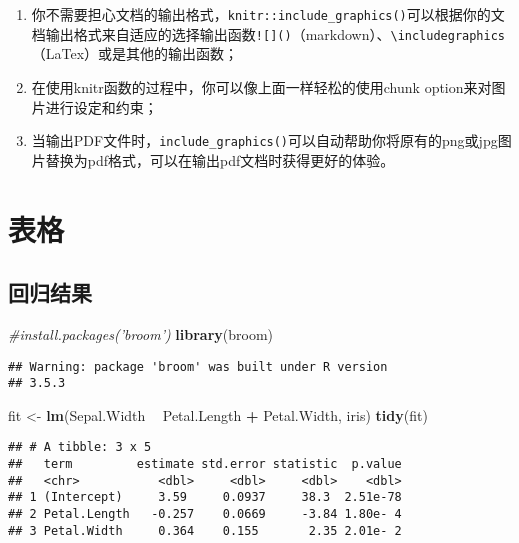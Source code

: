 \documentclass[singlesided]{Style/ucasthesis}%
\newcommand{\tightlist}{%
  \setlength{\itemsep}{0pt}\setlength{\parskip}{0pt}}
\newenvironment{Shaded}{\begin{snugshade}}{\end{snugshade}}
\newcommand{\KeywordTok}[1]{\textcolor[rgb]{0.13,0.29,0.53}{\textbf{{#1}}}}
\newcommand{\StringTok}[1]{\textcolor[rgb]{0.31,0.60,0.02}{{#1}}}
\newcommand{\CommentTok}[1]{\textcolor[rgb]{0.56,0.35,0.01}{\textit{{#1}}}}
\newcommand{\OperatorTok}[1]{\textcolor[rgb]{0.81,0.36,0.00}{\textbf{{#1}}}}
\newcommand{\NormalTok}[1]{{#1}}
\begin{document}
\begin{enumerate}
\def\labelenumi{\arabic{enumi}.}
\tightlist
\item
  你不需要担心文档的输出格式，\texttt{knitr::include\_graphics()}可以根据你的文档输出格式来自适应的选择输出函数\texttt{!{[}{]}()}（markdown）、\texttt{\textbackslash{}includegraphics}（LaTex）或是其他的输出函数；
\item
  在使用knitr函数的过程中，你可以像上面一样轻松的使用chunk option来对图片进行设定和约束；
\item
  当输出PDF文件时，\texttt{include\_graphics()}可以自动帮助你将原有的png或jpg图片替换为pdf格式，可以在输出pdf文档时获得更好的体验。
\end{enumerate}

\hypertarget{section-5}{%
\section{表格}\label{section-5}}

\hypertarget{section-6}{%
\subsection{回归结果}\label{section-6}}

\begin{Shaded}
\begin{Highlighting}[]
\CommentTok{#install.packages('broom')}
\KeywordTok{library}\NormalTok{(broom)}
\end{Highlighting}
\end{Shaded}

\begin{verbatim}
## Warning: package 'broom' was built under R version
## 3.5.3
\end{verbatim}

\begin{Shaded}
\begin{Highlighting}[]
\NormalTok{fit <-}\StringTok{ }\KeywordTok{lm}\NormalTok{(Sepal.Width }\OperatorTok{~}\StringTok{ }\NormalTok{Petal.Length }\OperatorTok{+}\StringTok{ }\NormalTok{Petal.Width, iris)}
\KeywordTok{tidy}\NormalTok{(fit)}
\end{Highlighting}
\end{Shaded}

\begin{verbatim}
## # A tibble: 3 x 5
##   term         estimate std.error statistic  p.value
##   <chr>           <dbl>     <dbl>     <dbl>    <dbl>
## 1 (Intercept)     3.59     0.0937     38.3  2.51e-78
## 2 Petal.Length   -0.257    0.0669     -3.84 1.80e- 4
## 3 Petal.Width     0.364    0.155       2.35 2.01e- 2
\end{verbatim}
\end{document}
